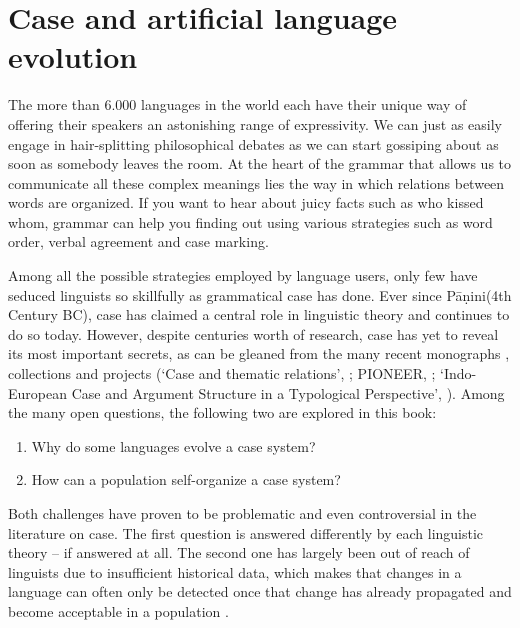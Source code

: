 
\chapter{Case and artificial language evolution}

The more than 6.000 languages in the world each have their unique way of offering their speakers an astonishing range of expressivity. We can just as easily engage in hair-splitting philosophical debates as we can start gossiping about as soon as somebody leaves the room. At the heart of the grammar that allows us to communicate all these complex meanings lies the way in which relations between words are organized. If you want to hear about juicy facts such as who kissed whom, grammar can help you finding out using various strategies such as word order, verbal agreement and case marking.

Among all the possible strategies employed by language users, only few have seduced linguists so skillfully as grammatical case has done. Ever since P\={a}\d{n}ini(4th Century BC), case has claimed a central role in linguistic theory and continues to do so today. However, despite centuries worth of research, case has yet to reveal its most important secrets, as can be gleaned from the many recent monographs \citep{blake94case,butt06theories}, collections \citep{kulikov06casebook,barddal09casebook,malchukov09case} and projects (`Case and thematic relations', \citealp{davidse96functional}; PIONEER, \citealp{amberber05competition}; `Indo-European Case and Argument Structure in a Typological Perspective', \citealp{barddal09case}). 
Among the many open questions, the following two are explored in this book:

\begin{enumerate}
\item Why do some languages evolve a case system?
\item How can a population self-organize a case system?
\end{enumerate}

Both challenges have proven to be problematic and even controversial in the literature on case. The first question is answered differently by each linguistic theory -- if answered at all. The second one has largely been out of reach of linguists due to insufficient historical data, which makes that changes in a language can often only be detected once that change has already propagated and become acceptable in a population \citep[34--35]{croft91syntactic}.

